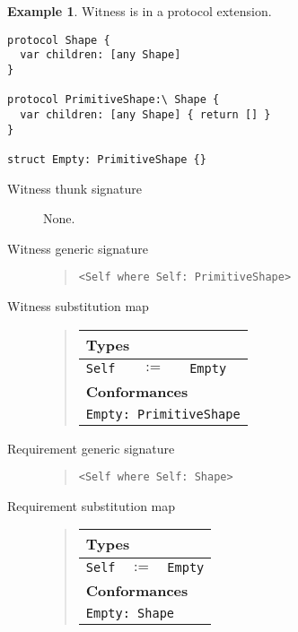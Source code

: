 \documentclass[a4paper,headsepline,bibliography=totoc,toc=flat,fleqn,twoside=semi]{scrbook}
\theoremstyle{definition}
\theoremstyle{definition}
\newtheorem{example}{Example}[chapter]
\theoremstyle{definition}
\newcommand{\SubMapC}[2]{\begin{tabular}{|lll|}
\hline
\multicolumn{3}{|l|}{\textbf{Types}}\\
\hline
#1\\
\hline
\hline
\multicolumn{3}{|l|}{\textbf{Conformances}}\\
\hline
#2\\
\hline
\end{tabular}}
\newcommand{\SubType}[2]{\texttt{#1}&$:=$&\texttt{#2}}
\newcommand{\SubConf}[1]{\multicolumn{3}{|l|}{\texttt{#1}}}
\begin{document}
\begin{example} Witness is in a protocol extension.
\begin{Verbatim}
protocol Shape {
  var children: [any Shape]
}

protocol PrimitiveShape:\ Shape {
  var children: [any Shape] { return [] }
}

struct Empty: PrimitiveShape {}
\end{Verbatim}
\begin{description}
\item[Witness thunk signature] None.
\item[Witness generic signature]  \vphantom{a}
\begin{quote}
\texttt{<Self where Self:\ PrimitiveShape>}
\end{quote}
\item[Witness substitution map] \vphantom{a}
\begin{quote}
\SubMapC{
\SubType{Self}{Empty}
}{
\SubConf{Empty:\ PrimitiveShape}
}
\end{quote}

\item[Requirement generic signature]  \vphantom{a}
\begin{quote}
\texttt{<Self where Self:\ Shape>}
\end{quote}
\item[Requirement substitution map] \phantom{a}
\begin{quote}
\SubMapC{
\SubType{Self}{Empty}
}{
\SubConf{Empty:\ Shape}
}
\end{quote}
\end{description}
\end{example}

\vfill
\eject
\end{document}
